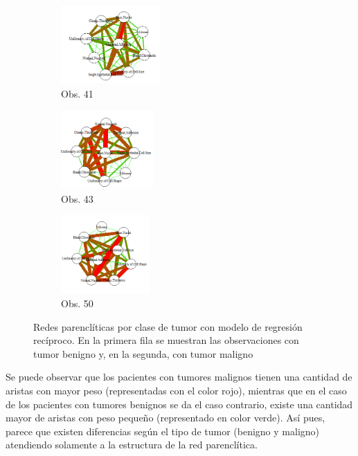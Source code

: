 \begin{figure}[htbp!]
\begin{center}
		\begin{subfigure}[t]{0.25\textwidth}
			\centering
			\includegraphics[height=3cm]{imagenes/cancer/m1_reciproco.png}
			\caption{Obs. 41}
		\end{subfigure}
		\begin{subfigure}[t]{0.25\textwidth}
			\centering
			\includegraphics[height=3cm]{imagenes/cancer/m2_reciproco.png}
			\caption{Obs. 43}
		\end{subfigure}
		\begin{subfigure}[t]{0.25\textwidth}
			\centering
			\includegraphics[height=3cm]{imagenes/cancer/m3_reciproco.png}
			\caption{Obs. 50}
		\end{subfigure}
	\end{center}
	\caption[Redes parenclíticas por clase de tumor con modelo de regresión recíproco]{Redes parenclíticas por clase de tumor con modelo de regresión recíproco. En la primera fila se muestran las observaciones con tumor benigno y, en la segunda, con tumor maligno}
	\label{fig:cancer_rec}
\end{figure}

Se puede observar que los pacientes con tumores malignos tienen una cantidad de aristas con mayor peso (representadas con el color rojo), mientras que en el caso de los pacientes con tumores benignos se da el caso contrario, existe una cantidad mayor de aristas con peso pequeño (representado en color verde). Así pues, parece que existen diferencias según el tipo de tumor (benigno y maligno) atendiendo solamente a la estructura de la red parenclítica.


